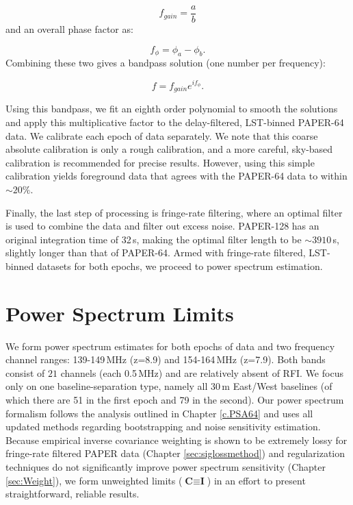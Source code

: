 \begin{equation}
f_{gain} = \frac{a}{b}
\end{equation}
and an overall phase factor as:

\begin{equation}
f_{\phi} = \phi_{a} - \phi_{b}.
\end{equation}
Combining these two gives a bandpass solution (one number per frequency):

\begin{equation}
f = f_{gain}e^{if_{\phi}}.
\end{equation}

Using this bandpass, we fit an eighth order polynomial to smooth the solutions and apply this multiplicative factor to the delay-filtered, LST-binned PAPER-64 data. We calibrate each epoch of data separately. We note that this coarse absolute calibration is only a rough calibration, and a more careful, sky-based calibration is recommended for precise results. However, using this simple calibration yields foreground data that agrees with the PAPER-64 data to within $\sim20\%$.

Finally, the last step of processing is fringe-rate filtering, where an optimal filter is used to combine the data and filter out excess noise. PAPER-128 has an original integration time of 32\,s, making the optimal filter length to be $\sim3910$\,s, slightly longer than that of PAPER-64. Armed with fringe-rate filtered, LST-binned datasets for both epochs, we proceed to power spectrum estimation.

\section{Power Spectrum Limits}

We form power spectrum estimates for both epochs of data and two frequency channel ranges: 139-149\,MHz (z=8.9) and 154-164\,MHz (z=7.9). Both bands consist of $21$ channels (each 0.5\,MHz) and are relatively absent of RFI. We focus only on one baseline-separation type, namely all 30\,m East/West baselines (of which there are 51 in the first epoch and 79 in the second). Our power spectrum formalism follows the analysis outlined in Chapter \ref{c.PSA64} and uses all updated methods regarding bootstrapping and noise sensitivity estimation. Because empirical inverse covariance weighting is shown to be extremely lossy for fringe-rate filtered PAPER data (Chapter \ref{sec:siglossmethod}) and regularization techniques do not significantly improve power spectrum sensitivity (Chapter \ref{sec:Weight}), we form unweighted limits ($\textbf{C} \equiv \textbf{I}$) in an effort to present straightforward, reliable results.

